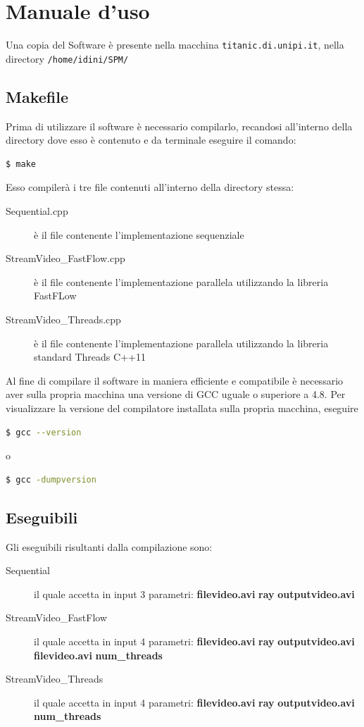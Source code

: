 \documentclass[12pt]{article}
\begin{document}
\section{Manuale d'uso} \label{App:AppendixA}
Una copia del Software \`e presente nella macchina \texttt{titanic.di.unipi.it}, nella directory \texttt{/home/idini/SPM/}
\subsection{Makefile}
Prima di utilizzare il software \`e necessario compilarlo, recandosi all'interno della directory dove esso \`e contenuto e da terminale eseguire il comando:
\begin{lstlisting}[language=bash]
  $ make
\end{lstlisting}
Esso compiler\`a i tre file contenuti all'interno della directory stessa: 
\begin{description}
\item[Sequential.cpp] \`e il file contenente l'implementazione sequenziale
\item[StreamVideo\_FastFlow.cpp] \`e il file contenente l'implementazione parallela utilizzando la libreria FastFLow
\item[StreamVideo\_Threads.cpp] \`e il file contenente l'implementazione parallela utilizzando la libreria standard Threads C++11
\end{description}
Al fine di compilare il software in maniera efficiente e compatibile \`e necessario aver sulla propria macchina una versione di GCC uguale o superiore a 4.8. Per visualizzare la versione del compilatore installata sulla propria macchina, eseguire 
\begin{lstlisting}[language=bash]
  $ gcc --version
\end{lstlisting}
o
\begin{lstlisting}[language=bash]
  $ gcc -dumpversion
\end{lstlisting}

\subsection{Eseguibili}
Gli eseguibili risultanti dalla compilazione sono:
\begin{description}
\item[Sequential] il quale accetta in input 3 parametri: \textbf{filevideo.avi} \textbf{ray} \textbf{outputvideo.avi}
\item[StreamVideo\_FastFlow] il quale accetta in input 4 parametri: \textbf{filevideo.avi} \textbf{ray} \textbf{outputvideo.avi} \textbf{filevideo.avi} \textbf{num\_threads} 
\item[StreamVideo\_Threads] il quale accetta in input 4 parametri: \textbf{filevideo.avi} \textbf{ray} \textbf{outputvideo.avi} \textbf{num\_threads} 
\end{description}
\end{document}
